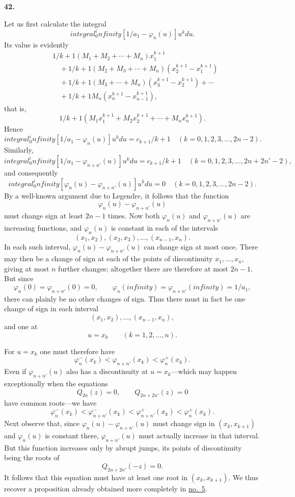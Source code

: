 \documentclass[
  paper=b5,
  fontsize=13pt,
  twoside,
  headings=normal,
  bookmarkpackage=false
]{scrartcl}
\theoremstyle{stieltjesplain}
\theoremstyle{stieltjesdefinition}
\def\int{integral}%
\def\frac#1#2{#1/#2}%
\def\infty{infinity}%
\def\,{ }%
\newcommand{\origsection}[1]{%
  \par\addvspace{0.85\baselineskip}%
  \phantomsection\label{sec:#1}%
  \addcontentsline{toc}{subsection}{\texorpdfstring{\S~#1}{Section #1}}%
  \noindent\textbf{#1.}\quad\ignorespaces
}
\begin{document}
\origsection{42}
Let us first calculate the integral
\[
 \int_0^\infty\left[\frac1{a_1}-\varphi_n(u)\right]u^k\,du.
\]
Its value is evidently
\begin{align*}
 &\frac1{k+1}(M_1+M_2+\cdots+M_n)x_1^{k+1}\\
 &\quad+\frac1{k+1}(M_2+M_3+\cdots+M_n)(x_2^{k+1}-x_1^{k+1})\\
 &\quad+\frac1{k+1}(M_3+\cdots+M_n)(x_3^{k+1}-x_2^{k+1})+\cdots\\
 &\quad+\frac1{k+1}M_n(x_n^{k+1}-x_{n-1}^{k+1}),
\end{align*}
that is,
\[
 \frac1{k+1}(M_1x_1^{k+1}+M_2x_2^{k+1}+\cdots+M_nx_n^{k+1}).
\]
Hence
\[
 \int_0^\infty\left[\frac1{a_1}-\varphi_n(u)\right]u^k\,du
 =\frac{c_{k+1}}{k+1}
 \quad(k=0,1,2,3,\ldots,2n-2).
\]
Similarly,
\[
 \int_0^\infty\left[\frac1{a_1}-\varphi_{n+n'}(u)\right]u^k\,du
 =\frac{c_{k+1}}{k+1}
 \quad(k=0,1,2,3,\ldots,2n+2n'-2),
\]
and consequently
\[
 \int_0^\infty[\varphi_n(u)-\varphi_{n+n'}(u)]u^k\,du=0
 \quad(k=0,1,2,3,\ldots,2n-2).
\]
By a well-known argument due to Legendre, it follows that the function
\[
 \varphi_n(u)-\varphi_{n+n'}(u)
\]
must change sign at least $2n-1$ times. Now both $\varphi_n(u)$ and $\varphi_{n+n'}(u)$ are increasing functions, and $\varphi_n(u)$ is constant in each of the intervals
\[
 (x_1,x_2),(x_2,x_3),\ldots,(x_{n-1},x_n).
\]
In each such interval, $\varphi_n(u)-\varphi_{n+n'}(u)$ can change sign at most once. There may then be a change of sign at each of the points of discontinuity $x_1,\ldots,x_n$, giving at most $n$ further changes; altogether there are therefore at most $2n-1$. But since
\[
 \varphi_n(0)=\varphi_{n+n'}(0)=0,
 \qquad
 \varphi_n(\infty)=\varphi_{n+n'}(\infty)=\frac1{a_1},
\]
there can plainly be no other changes of sign. Thus there must in fact be one change of sign in each interval
\[
 (x_1,x_2),\ldots,(x_{n-1},x_n),
\]
and one at
\[
 u=x_k\qquad(k=1,2,\ldots,n).
\]

For $u=x_k$ one must therefore have
\[
 \varphi_n^{-}(x_k)<\varphi_{n+n'}(x_k)<\varphi_n^{+}(x_k).
\]
Even if $\varphi_{n+n'}(u)$ also has a discontinuity at $u=x_k$---which may happen exceptionally when the equations
\[
 Q_{2n}(z)=0,\qquad Q_{2n+2n'}(z)=0
\]
have common roots---we have
\[
 \varphi_n^{-}(x_k)<\varphi_{n+n'}^{-}(x_k)
 <\varphi_{n+n'}^{+}(x_k)<\varphi_n^{+}(x_k).
\]
Next observe that, since $\varphi_n(u)-\varphi_{n+n'}(u)$ must change sign in $(x_k,x_{k+1})$ and $\varphi_n(u)$ is constant there, $\varphi_{n+n'}(u)$ must actually increase in that interval. But this function increases only by abrupt jumps, its points of discontinuity being the roots of
\[
 Q_{2n+2n'}(-z)=0.
\]
It follows that this equation must have at least one root in $(x_k,x_{k+1})$. We thus recover a proposition already obtained more completely in \hyperref[sec:5]{no.~5}.
\end{document}
